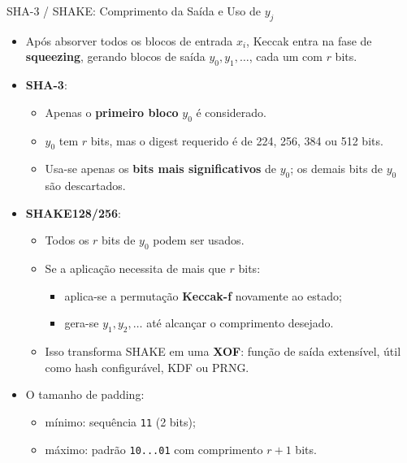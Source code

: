 \documentclass{beamer}
\begin{document}
\begin{frame}{SHA-3 / SHAKE: Comprimento da Saída e Uso de \texorpdfstring{$y_j$}{yj}}
  \begin{itemize}
    \item Após absorver todos os blocos de entrada $x_i$, Keccak entra na fase de \textbf{squeezing},
          gerando blocos de saída $y_0, y_1, \dots$, cada um com $r$ bits.
    \item \textbf{SHA-3}:
      \begin{itemize}
        \item Apenas o \textbf{primeiro bloco} $y_0$ é considerado.
        \item $y_0$ tem $r$ bits, mas o digest requerido é de 224, 256, 384 ou 512 bits.
        \item Usa-se apenas os \textbf{bits mais significativos} de $y_0$;
              os demais bits de $y_0$ são descartados.
      \end{itemize}
    \item \textbf{SHAKE128/256}:
      \begin{itemize}
        \item Todos os $r$ bits de $y_0$ podem ser usados.
        \item Se a aplicação necessita de mais que $r$ bits:
          \begin{itemize}
            \item aplica-se a permutação \textbf{Keccak-f} novamente ao estado;
            \item gera-se $y_1, y_2, \dots$ até alcançar o comprimento desejado.
          \end{itemize}
        \item Isso transforma SHAKE em uma \textbf{XOF}: função de saída extensível, útil como
              hash configurável, KDF ou PRNG.
      \end{itemize}
    \item O tamanho de padding:
      \begin{itemize}
        \item mínimo: sequência \texttt{11} (2 bits);
        \item máximo: padrão \texttt{10...01} com comprimento $r+1$ bits.
      \end{itemize}
  \end{itemize}
\end{frame}
\end{document}
